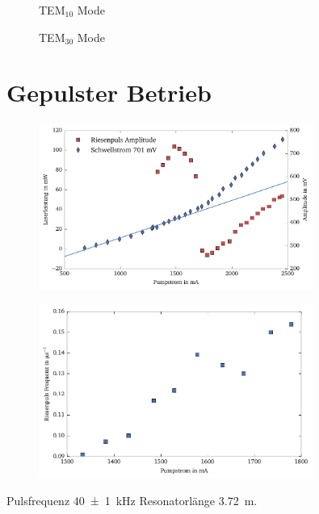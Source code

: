 \documentclass[11pt,twoside=true]{scrartcl}
\begin{document}
\begin{figure}[H]
  \begin{floatrow}
     {
      \caption{TEM$_{10}$ Mode}
      \label{fig:tem10}
    }
     {
      \caption{TEM$_{30}$ Mode}
      \label{fig:tem20}
    }
  \end{floatrow}
\end{figure}

\section{Gepulster Betrieb}
\begin{figure}[H]
  \centering
  \includegraphics[width=0.8\textwidth]{./figures/pi_qs_uebergang.pdf}
  \caption{}
  \label{fig:pi_qs_uebergang}
\end{figure}

\begin{figure}[H]
  \centering
  \includegraphics[width=0.8\textwidth]{./figures/freq_riesenpulse.pdf}
  \caption{}
  \label{fig:freq_riesenpulse}
\end{figure}
Pulsfrequenz \SI{40 \pm 1}{\kilo\hertz}
Resonatorlänge \SI{3.72}{\metre}.
\end{document}

